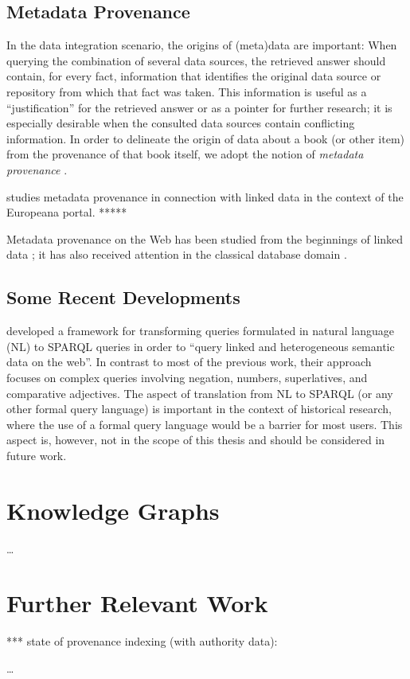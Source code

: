 \subsection{Metadata Provenance}
\label{sec:data_provenance}

In the data integration scenario, the origins of (meta)data are important:
When querying the combination of several data sources, the retrieved answer
should contain, for every fact, information that identifies the original data source or repository
from which that fact was taken.
This information is useful as a \enquote{justification} for the retrieved answer
or as a pointer for further research;
it is especially desirable when the consulted data sources contain conflicting information.
In order to delineate the origin of data about a book (or other item)
from the provenance of that book itself,
we adopt the notion of \emph{metadata provenance} \autocite{Eckert2012}.

\textcite{Eckert2013,Eckert2012} studies metadata provenance in connection with linked data
in the context of the Europeana portal. ***** 

Metadata provenance on the Web
has been studied
from the beginnings of linked data
\autocite[][see, e.g.]{Hartig2009,Moreau2008,Moreau2008a};
it has also received attention in the classical database domain \autocite[Chapter 14][see, e.g.]{Doan2012}.

\subsection{Some Recent Developments}

\textcite{Boumechaal2023} developed a framework for transforming queries formulated in natural language (NL)
to SPARQL queries in order to \enquote{query linked and heterogeneous semantic data on the web}.
In contrast to most of the previous work, their approach focuses on complex queries
involving negation, numbers, superlatives, and comparative adjectives.
The aspect of translation from NL to SPARQL (or any other formal query language)
is important in the context of historical research, where the use of a formal query language
would be a barrier for most users. This aspect is, however, not in the scope of this thesis
and should be considered in future work.





\section{Knowledge Graphs}
\label{sec:KGs}

\dots


\section{Further Relevant Work}
\label{sec:further}


*** state of provenance indexing (with authority data): \autocite{Hakelberg2016}


\dots

